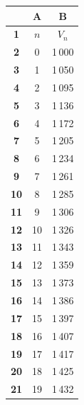 \begin{minipage}[t]{0.2\textwidth}
\vspace{0pt}
\centering
\renewcommand{\arraystretch}{1.2}
\begin{tabular}{|>{\columncolor{lightgray}}c|c|c|}
\hline
\rowcolor{lightgray}
\textbf{} & \textbf{A} & \textbf{B} \\ \hline
\textbf{1} & $n$ & $V_n$ \\ \hline
\textbf{2} & 0 & 1\,000 \\ \hline
\textbf{3} & 1 & 1\,050 \\ \hline
\textbf{4} & 2 & 1\,095 \\ \hline
\textbf{5} & 3 & 1\,136 \\ \hline
\textbf{6} & 4 & 1\,172 \\ \hline
\textbf{7} & 5 & 1\,205 \\ \hline
\textbf{8} & 6 & 1\,234 \\ \hline
\textbf{9} & 7 & 1\,261 \\ \hline
\textbf{10} & 8 & 1\,285 \\ \hline
\textbf{11} & 9 & 1\,306 \\ \hline
\textbf{12} & 10 & 1\,326 \\ \hline
\textbf{13} & 11 & 1\,343 \\ \hline
\textbf{14} & 12 & 1\,359 \\ \hline
\textbf{15} & 13 & 1\,373 \\ \hline
\textbf{16} & 14 & 1\,386 \\ \hline
\textbf{17} & 15 & 1\,397 \\ \hline
\textbf{18} & 16 & 1\,407 \\ \hline
\textbf{19} & 17 & 1\,417 \\ \hline
\textbf{20} & 18 & 1\,425 \\ \hline
\textbf{21} & 19 & 1\,432 \\ \hline
\end{tabular}
\end{minipage}

